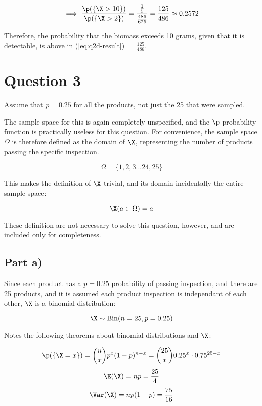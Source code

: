\begin{equation}
\label{eq:q2d-result}
\implies \frac{\p(\{ \X > 10 \})}{\p (\{ \X > 2 \})}
= \frac{\frac{1}{5}}{\frac{486}{625}}
= \frac{125}{486}
\approx 0.2572
\end{equation}

Therefore, the probability that the biomass exceeds 10 grams, given that it is detectable, is above in (\ref{eq:q2d-result}) $ = \frac{125}{486}$.

\newpage

\section*{Question 3}

Assume that $p = 0.25$ for all the products, not just the 25 that were sampled.

The sample space for this is again completely unspecified, and the $\p$ probability function is practically useless for this question.
For convenience, the sample space $\Omega$ is therefore defined as the domain of $\X$, representing the number of products passing the specific inspection.

\[
\Omega = \{ 1, 2, 3 ... 24, 25 \}
\]

This makes the definition of $\X$ trivial, and its domain incidentally the entire sample space:

\[
\X(a \in \Omega) = a
\]

These definition are not necessary to solve this question, however, and are included only for completeness.


\subsection*{Part a)}

Since each product has a $p = 0.25$ probability of passing inspection, and there are 25 products, and it is assumed each product inspection is independant of each other, $\X$ is a binomial distribution:

\[
\X \sim \mathrm{Bin}(n = 25, p = 0.25)
\]

Notes the following theorems about binomial distributions and $\X$:

\[
\p(\{ \X = x \}) = {n \choose x}p^x (1-p)^{n - x} = {25 \choose x}0.25^x \cdot 0.75^{25 - x}
\]
\[
\E(\X) = np = \frac{25}{4}
\]
\[
\Var(\X) = np(1-p) = \frac{75}{16}
\]

